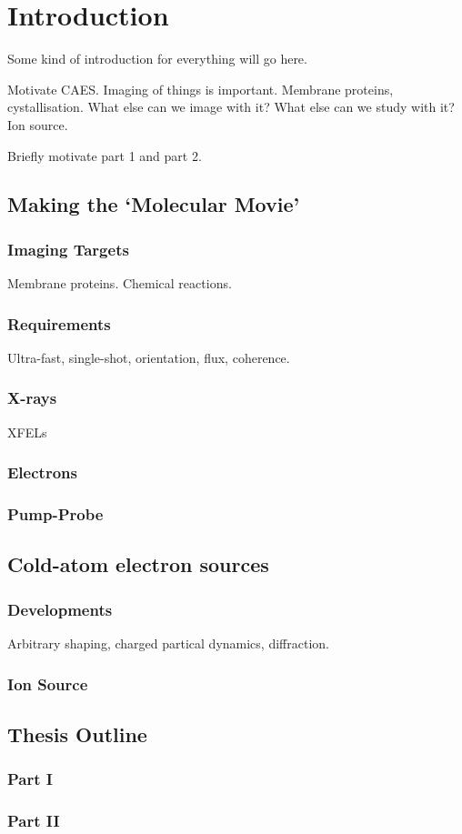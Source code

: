  \chapter{Introduction}
 
\setcounter{page}{1}

Some kind of introduction for everything will go here.

Motivate CAES. Imaging of things is important. Membrane proteins, cystallisation. What else can we image with it? What else can we study with it? Ion source.

Briefly motivate part 1 and part 2.

\section{Making the `Molecular Movie'}

\subsection{Imaging Targets}

Membrane proteins.
Chemical reactions.


\subsection{Requirements}

Ultra-fast, single-shot, orientation, flux, coherence.

\subsection{X-rays}

XFELs

\subsection{Electrons}

\subsection{Pump-Probe}

\section{Cold-atom electron sources}

\subsection{Developments}

Arbitrary shaping, charged partical dynamics, diffraction.
\subsection{Ion Source}

\section{Thesis Outline}

\subsection{Part I}

\subsection{Part II}
